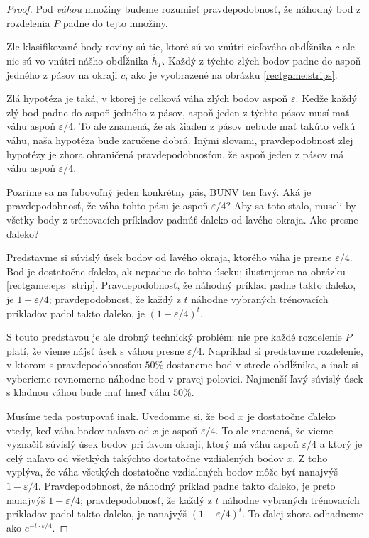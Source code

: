\begin{proof}
  Pod \emph{váhou} množiny budeme rozumieť pravdepodobnosť, že náhodný
  bod z rozdelenia $P$ padne do tejto množiny.

  Zle klasifikované body roviny sú tie, ktoré sú vo vnútri cieľového obdĺžnika
  $c$ ale nie sú vo vnútri nášho obdĺžnika $\hat{h}_T$. Každý z týchto zlých
  bodov padne do aspoň jedného z pásov na okraji $c$, ako je vyobrazené
  na obrázku \ref{rectgame:strips}.

  Zlá hypotéza je taká, v ktorej je celková váha zlých bodov aspoň $\varepsilon$.
  Kedže každý zlý bod padne do aspoň jedného z pásov, aspoň jeden z týchto pásov
  musí mať váhu aspoň $\varepsilon/4$. To ale znamená, že ak žiaden z pásov
  nebude mať takúto veľkú váhu, naša hypotéza bude zaručene dobrá. Inými
  slovami, pravdepodobnosť zlej hypotézy je zhora ohraničená pravdepodobnosťou,
  že aspoň jeden z pásov má váhu aspoň $\varepsilon/4$.
  
  Pozrime sa na ľubovoľný jeden konkrétny pás, BUNV ten ľavý. Aká je
  pravdepodobnosť, že váha tohto pásu je aspoň $\varepsilon/4$? Aby sa
  toto stalo, museli by všetky body z trénovacích príkladov padnúť
  ďaleko od ľavého okraja. Ako presne ďaleko?
  
  Predstavme si súvislý úsek bodov od ľavého okraja, ktorého váha je
  presne $\varepsilon/4$. Bod je dostatočne ďaleko, ak nepadne do tohto
  úseku; ilustrujeme na obrázku \ref{rectgame:eps_strip}. Pravdepodobnosť,
  že náhodný príklad padne takto ďaleko, je $1 - \varepsilon/4$; pravdepodobnosť,
  že každý z $t$ náhodne vybraných trénovacích príkladov padol takto ďaleko,
  je $(1 - \varepsilon/4)^t$.
  
  S touto predstavou je ale drobný technický problém: nie pre každé
  rozdelenie $P$ platí, že vieme nájsť úsek s váhou presne $\varepsilon/4$.
  Napríklad si predstavme rozdelenie, v ktorom s pravdepodobnosťou $50\%$
  dostaneme bod v strede obdĺžnika, a inak si vyberieme rovnomerne náhodne
  bod v pravej polovici. Najmenší ľavý súvislý úsek s kladnou váhou bude mať
  hneď váhu $50\%$.
  
  Musíme teda postupovať inak. Uvedomme si, že bod $x$ je dostatočne ďaleko vtedy, keď váha bodov naľavo
  od $x$ je aspoň $\varepsilon/4$. To ale znamená, že vieme vyznačiť súvislý
  úsek bodov pri ľavom okraji, ktorý má váhu aspoň $\varepsilon/4$ a ktorý
  je celý naľavo od všetkých takýchto dostatočne vzdialených bodov $x$.
  Z toho vyplýva, že váha všetkých dostatočne vzdialených bodov môže
  byť nanajvýš $1 - \varepsilon/4$. Pravdepodobnosť, že náhodný príklad
  padne takto ďaleko, je preto nanajvýš $1 - \varepsilon/4$; pravdepodobnosť,
  že každý z $t$ náhodne vybraných trénovacích príkladov padol takto ďaleko,
  je nanajvýš $(1 - \varepsilon/4)^t$. To ďalej zhora odhadneme ako $e^{-t \cdot \varepsilon/4}$.
  

\end{proof}
